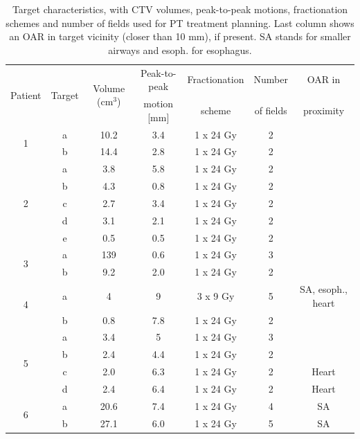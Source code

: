 \begin{table}[H]
	\centering
	\caption{Target characteristics, with CTV volumes, peak-to-peak motions, fractionation schemes and number of fields used for PT treatment planning. Last column 
	shows an OAR in target vicinity (closer than 10 mm), if present. SA stands for smaller airways and esoph. for esophagus.}
	\begin{tabular}{c|c|c|c|c|c|c}
		\hline\hline
		\multirow{2}{*}{Patient} & \multirow{2}{*}{Target} & \multirow{2}{*}{Volume (cm$^3$)} & Peak-to-peak & Fractionation & Number & OAR in \\
		 & & & motion [mm] & scheme & of fields & proximity \\
		\hline
		\multirow{2}{*}{1} & a & 10.2 & 3.4  & 1 x 24 Gy & 2 & \\
		 & b & 14.4 & 2.8 & 1 x 24 Gy  & 2 &  \\

		 
		 \hline
		 \multirow{5}{*}{2} & a & 3.8 & 5.8  & 1 x 24 Gy & 2 &\\
		  & b & 4.3 & 0.8  & 1 x 24 Gy& 2 &\\
		  & c & 2.7 & 3.4  & 1 x 24 Gy & 2&\\
		  & d & 3.1 & 2.1  & 1 x 24 Gy & 2&\\
		  & e & 0.5 & 0.5  & 1 x 24 Gy & 2&\\
		  \hline
		  \multirow{2}{*}{3} & a & 139 & 0.6 & 1 x 24 Gy & 3 \\
		 & b & 9.2 & 2.0  & 1 x 24 Gy & 2 \\
		 \hline
		 \multirow{2}{*}{4} & a & 4 & 9  & 3 x 9 Gy  & 5 & SA, esoph., heart \\
		 & b & 0.8 & 7.8  & 1 x 24 Gy & 2 \\
		 \hline
		 \multirow{4}{*}{5} & a & 3.4   & 5  & 1 x 24 Gy & 3 &  \\
				    & b & 2.4 & 4.4  & 1 x 24 Gy & 2 &\\
				    & c & 2.0 & 6.3  & 1 x 24 Gy& 2& Heart\\
				    & d & 2.4 & 6.4  & 1 x 24 Gy & 2 & Heart\\
		\hline	    
		\multirow{2}{*}{6} & a & 20.6 & 7.4 & 1 x 24 Gy & 4 & SA  \\
		 & b & 27.1 & 6.0  & 1 x 24 Gy &5 & SA  \\
		 

\end{tabular}
\end{table}
